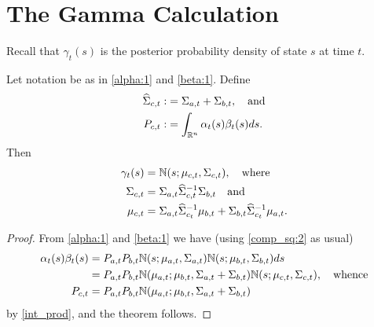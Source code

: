 \documentclass[12pt,leqno]{article}
\begin{document}
\section{The Gamma Calculation}
Recall that $\gamma_t(s)$ is the posterior probability density of state $s$
at time $t$. 
\begin{Thm}
  Let notation be as in \eqref{alpha:1} and \eqref{beta:1}.  Define
\begin{align*}
  \widehat{\Sigma}_{c,t} :&= \Sigma_{a,t}+\Sigma_{b,t}, \quad\text{and}\\
  P_{c,t} :&= \int_{{\mathbb R}^n}\alpha_t(s)\beta_t(s)ds.
\end{align*}
  Then
  \begin{align*}
      \gamma_t(s) &= {\mathbb N}(s;\mu_{c,t},\Sigma_{c,t}),\quad\text{where}\\
      \Sigma_{c,t} &= \Sigma_{a,t}\widehat{\Sigma}_{c,t}^{-1}\Sigma_{b,t}
      \quad\text{and}\\
      \mu_{c,t} &= \Sigma_{a,t}\widehat{\Sigma}_{c_t}^{-1}\mu_{b,t} +
      \Sigma_{b,t}\widehat{\Sigma}_{c_t}^{-1}\mu_{a,t}.
  \end{align*}
\end{Thm}
\begin{proof}
  From \eqref{alpha:1} and \eqref{beta:1} we have (using \eqref{comp_sq:2}
  as usual)
  \begin{align*}
  \alpha_t(s)\beta_t(s) &= P_{a,t}P_{b,t}{\mathbb N}(s;\mu_{a,t},\Sigma_{a,t})
  {\mathbb N}(s;\mu_{b,t},\Sigma_{b,t})ds\\
  &= P_{a,t}P_{b,t}{\mathbb N}(\mu_{a,t};\mu_{b,t},\Sigma_{a,t}+\Sigma_{b,t}){\mathbb N}(s;\mu_{c,t},
  \Sigma_{c,t}), \quad\text{whence}\\
  P_{c,t} &= P_{a,t}P_{b,t}{\mathbb N}(\mu_{a,t};\mu_{b,t},\Sigma_{a,t}+\Sigma_{b,t})
  \end{align*}
by \eqref{int_prod}, and the theorem follows.
\end{proof}
\end{document}
